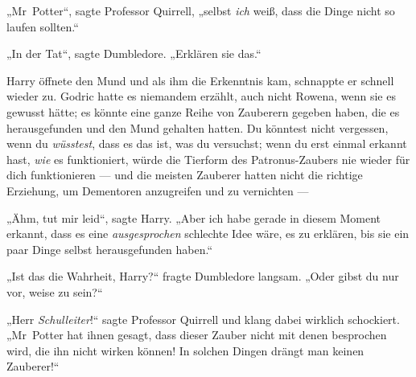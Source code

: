 „Mr~Potter“, sagte Professor Quirrell, „selbst \emph{ich} weiß, dass die Dinge nicht so laufen sollten.“

„In der Tat“, sagte Dumbledore.
„Erklären sie das.“

Harry öffnete den Mund und als ihm die Erkenntnis kam, schnappte er schnell wieder zu. Godric hatte es niemandem erzählt, auch nicht Rowena, wenn sie es gewusst hätte; es könnte eine ganze Reihe von Zauberern gegeben haben, die es herausgefunden und den Mund gehalten hatten. Du könntest nicht vergessen, wenn du \emph{wüsstest}, dass es das ist, was du versuchst; wenn du erst einmal erkannt hast, \emph{wie} es funktioniert, würde die Tierform des Patronus-Zaubers nie wieder für dich funktionieren — und die meisten Zauberer hatten nicht die richtige Erziehung, um Dementoren anzugreifen und zu vernichten —

„Ähm, tut mir leid“, sagte Harry.
„Aber ich habe gerade in diesem Moment erkannt, dass es eine \emph{ausgesprochen} schlechte Idee wäre, es zu erklären, bis sie ein paar Dinge selbst herausgefunden haben.“

„Ist das die Wahrheit, Harry?“ fragte Dumbledore langsam.
„Oder gibst du nur vor, weise zu sein?“

„Herr \emph{Schulleiter}!“ sagte Professor Quirrell und klang dabei wirklich schockiert.
„Mr~Potter hat ihnen gesagt, dass dieser Zauber nicht mit denen besprochen wird, die ihn nicht wirken können! In solchen Dingen drängt man keinen Zauberer!“

